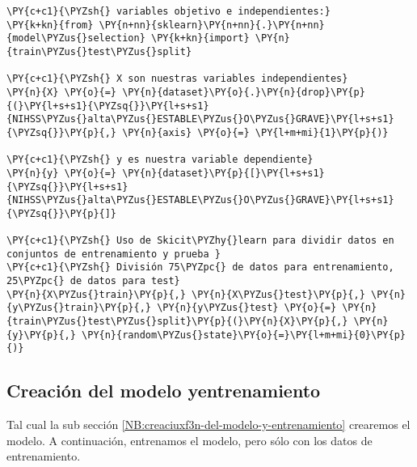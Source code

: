     \begin{tcolorbox}[breakable, size=fbox, boxrule=1pt, pad at break*=1mm,colback=cellbackground, colframe=cellborder]
\begin{Verbatim}[commandchars=\\\{\}]
\PY{c+c1}{\PYZsh{} variables objetivo e independientes:}
\PY{k+kn}{from} \PY{n+nn}{sklearn}\PY{n+nn}{.}\PY{n+nn}{model\PYZus{}selection} \PY{k+kn}{import} \PY{n}{train\PYZus{}test\PYZus{}split}

\PY{c+c1}{\PYZsh{} X son nuestras variables independientes}
\PY{n}{X} \PY{o}{=} \PY{n}{dataset}\PY{o}{.}\PY{n}{drop}\PY{p}{(}\PY{l+s+s1}{\PYZsq{}}\PY{l+s+s1}{NIHSS\PYZus{}alta\PYZus{}ESTABLE\PYZus{}O\PYZus{}GRAVE}\PY{l+s+s1}{\PYZsq{}}\PY{p}{,} \PY{n}{axis} \PY{o}{=} \PY{l+m+mi}{1}\PY{p}{)}

\PY{c+c1}{\PYZsh{} y es nuestra variable dependiente}
\PY{n}{y} \PY{o}{=} \PY{n}{dataset}\PY{p}{[}\PY{l+s+s1}{\PYZsq{}}\PY{l+s+s1}{NIHSS\PYZus{}alta\PYZus{}ESTABLE\PYZus{}O\PYZus{}GRAVE}\PY{l+s+s1}{\PYZsq{}}\PY{p}{]}

\PY{c+c1}{\PYZsh{} Uso de Skicit\PYZhy{}learn para dividir datos en conjuntos de entrenamiento y prueba }
\PY{c+c1}{\PYZsh{} División 75\PYZpc{} de datos para entrenamiento, 25\PYZpc{} de datos para test}
\PY{n}{X\PYZus{}train}\PY{p}{,} \PY{n}{X\PYZus{}test}\PY{p}{,} \PY{n}{y\PYZus{}train}\PY{p}{,} \PY{n}{y\PYZus{}test} \PY{o}{=} \PY{n}{train\PYZus{}test\PYZus{}split}\PY{p}{(}\PY{n}{X}\PY{p}{,} \PY{n}{y}\PY{p}{,} \PY{n}{random\PYZus{}state}\PY{o}{=}\PY{l+m+mi}{0}\PY{p}{)}
\end{Verbatim}
\end{tcolorbox}

    \hypertarget{creaciuxf3n-del-modelo-y-entrenamiento}{%
\subsection{Creación del modelo yentrenamiento}\label{creaciuxf3n-del-modelo-y-entrenamiento}}

	Tal cual la sub sección \ref{NB:creaciuxf3n-del-modelo-y-entrenamiento} crearemos el modelo.
	A continuación, entrenamos el modelo, pero sólo con los datos de entrenamiento. 

